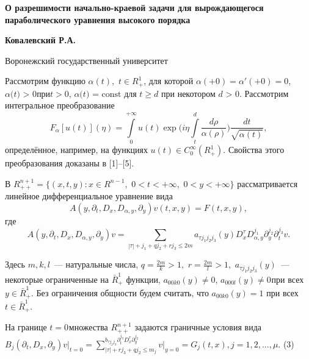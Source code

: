 \begin{center}
\textbf{О разрешимости начально-краевой задачи для вырождающегося
параболического уравнения высокого порядка}
\end{center}

\begin{center}
\textbf{Ковалевский Р.А.}
\end{center}

\begin{center}
Воронежский государственный университет
\end{center}





Рассмотрим функцию $\alpha (t),\,\,t \in R_ + ^1 $, для которой $\alpha ( +
0) = {\alpha }'( + 0) = 0$, $\alpha \mbox{(}t\mbox{) > 0}$при$t > 0$,
$\alpha \mbox{(}t\mbox{) = const}$ для $t \geqslant d$ при некотором $d\mbox{ >
0}$. Рассмотрим интегральное преобразование
\[
F_\alpha [u(t)](\eta ) = \int\limits_0^{ + \infty } {u(t)\exp (i\eta }
\int\limits_t^d {\frac{d\rho }{\alpha (\rho )}} )\frac{dt}{\sqrt {\alpha
(t)} },
\]
определённое, например, на функциях
$u(t) \in C_0^\infty (R_ + ^1 )$.
Свойства этого преобразования доказаны в [1]--[5].

В $R_{ + + }^{n + 1} = \{(x,t,y):x \in R^{n - 1},\,\,0 < t < + \infty ,\,\,0
< y < + \infty \}$ рассматривается линейное дифференциальное уравнение вида
\begin{equation}
\label{eq4700}
A(y,\partial _t ,D_x ,D_{\alpha ,y} ,\partial _y )v(t,x,y) = F(t,x,y),
\end{equation}
где
\begin{equation}
\label{eq4701}
A(y,\partial _t ,D_x ,D_{\alpha ,y} ,\partial _y )v = \sum\limits_{\left|
\tau \right| + j_1 + qj_2 + rj_3 \leqslant 2m} {a_{\tau j_1 j_2 j_3 } (y)D_x^\tau
D_{\alpha ,y}^{j_1 } } \partial _y^{j_2 } \partial _t^{j_3 } v.
\end{equation}



Здесь $m,k,l$~--- натуральные числа, $q = \frac{2m}{k} > 1,\,\,r = \frac{2m}{l} >
1,\,\,a_{\tau j_1 j_2 j_3 } (y)$~--- некоторые ограниченные на $\bar {R}_ + ^1
$ функции,
\linebreak
$a_{00k0} (y) \ne 0$, $a_{000l} (y) \ne 0_{ }$при всех$y \in
\bar {R}_ + ^1 .$ Без ограничения общности будем считать, что $a_{00k0} (y)
= 1$ при всех $t \in \bar {R}_ + ^1 .$

На границе $t = 0_{ }$множества $R_{ + + }^{n + 1} $ задаются граничные
условия вида$B_j (\partial _t ,D_x ,\partial _y )\left. v \right|_{t = 0} =
\sum\limits_{\left| \tau \right| + rj_3 + qj_2 \leqslant m_j }^ {b_{\tau j_2 j_3 }
\partial _t^{j_3 } D_x^\tau \partial _y^{j_2 } } \left. v \right|_{y = 0} =
G_j (t,x),j = 1,2,...,\mu .$ (3)

